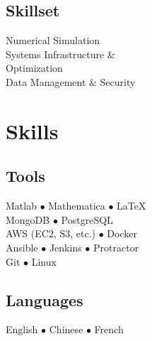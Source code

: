 \documentclass[]{yubo-resume-openfont}
\begin{document}
\begin{minipage}[t]{0.33\textwidth}
{    \subsection{Skillset}
    Numerical Simulation\\
    Systems Infrastructure \&\\
        \tab Optimization\\
    Data Management \& Security
}

\section{Skills}
    \ifisCS
        \ProgrammingSkills
        \sectionsep
        \Skillset
    \else
        \Skillset
        \sectionsep
        \ProgrammingSkills
    \fi
    \sectionsep
    \subsection{Tools}
    Matlab $\bullet$ Mathematica $\bullet$ \LaTeX\\
    MongoDB $\bullet$ PostgreSQL \\
    AWS (EC2, S3, etc.) $\bullet$ Docker\\
    Ansible $\bullet$ Jenkins $\bullet$ Protractor\\
    Git $\bullet$ Linux\\
    \sectionsep
    \subsection{Languages}
    English $\bullet$ Chinese $\bullet$ French
    \sectionsep




\def\PhWork{
    \subsection{Physics}
        Astrophysical Processes\\
        Advanced Plasma Physics\\
        Computational Physics\\
        Introduction to Particle Physics\\
        Introduction to Solid State Physics\\
}
\def\CSWork{
}
\end{minipage}
\end{document}
